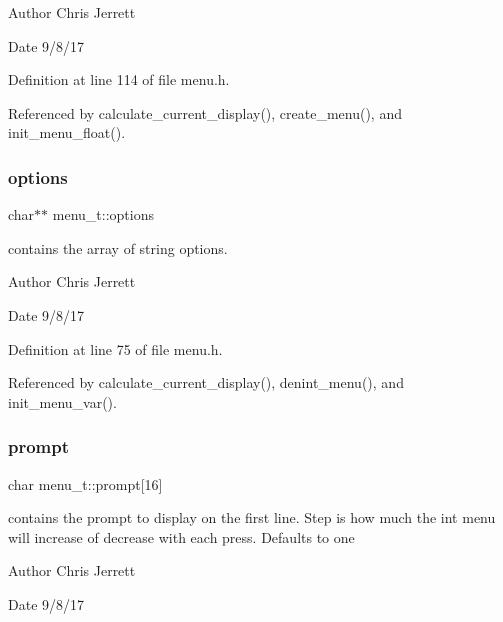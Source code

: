 \begin{DoxyAuthor}{Author}
Chris Jerrett 
\end{DoxyAuthor}
\begin{DoxyDate}{Date}
9/8/17 
\end{DoxyDate}


Definition at line 114 of file menu.\+h.



Referenced by calculate\+\_\+current\+\_\+display(), create\+\_\+menu(), and init\+\_\+menu\+\_\+float().

\mbox{\label{structmenu__t_ad695cd88051e34817f0f582d4e43c33a}} 
\subsubsection{\texorpdfstring{options}{options}}
{\footnotesize\ttfamily char$\ast$$\ast$ menu\+\_\+t\+::options}



contains the array of string options. 

\begin{DoxyAuthor}{Author}
Chris Jerrett 
\end{DoxyAuthor}
\begin{DoxyDate}{Date}
9/8/17 
\end{DoxyDate}


Definition at line 75 of file menu.\+h.



Referenced by calculate\+\_\+current\+\_\+display(), denint\+\_\+menu(), and init\+\_\+menu\+\_\+var().

\mbox{\label{structmenu__t_a5e3af2830962c2bbcb0a983f2c040c65}} 
\subsubsection{\texorpdfstring{prompt}{prompt}}
{\footnotesize\ttfamily char menu\+\_\+t\+::prompt\mbox{[}16\mbox{]}}



contains the prompt to display on the first line. Step is how much the int menu will increase of decrease with each press. Defaults to one 

\begin{DoxyAuthor}{Author}
Chris Jerrett 
\end{DoxyAuthor}
\begin{DoxyDate}{Date}
9/8/17 
\end{DoxyDate}


